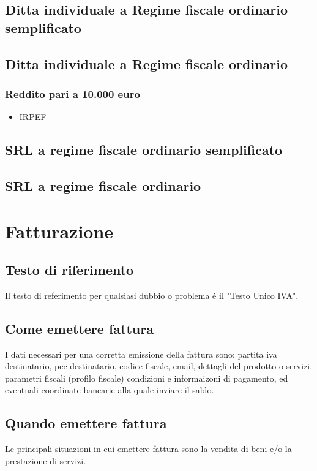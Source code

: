 \documentclass{article}
\begin{document}
\subsection{Ditta individuale a Regime fiscale ordinario semplificato}

\subsection{Ditta individuale a Regime fiscale ordinario}
\subsubsection{Reddito pari a 10.000 euro}
\begin{itemize}
    \item IRPEF 
\end{itemize}

\subsection{SRL a regime fiscale ordinario semplificato}

\subsection{SRL a regime fiscale ordinario}

\section{Fatturazione}

\subsection{Testo di riferimento}
Il testo di referimento per qualsiasi dubbio o problema \'e il "Testo Unico IVA".

\subsection{Come emettere fattura}
I dati necessari per una corretta emissione della fattura sono: partita iva destinatario, pec destinatario, codice fiscale, email, 
dettagli del prodotto o servizi, parametri fiscali (profilo fiscale) condizioni e informaizoni di pagamento, ed eventuali coordinate bancarie alla quale inviare il saldo.


\subsection{Quando emettere fattura}
Le principali situazioni in cui emettere fattura sono la vendita di beni e/o la prestazione di servizi. 
\end{document}
